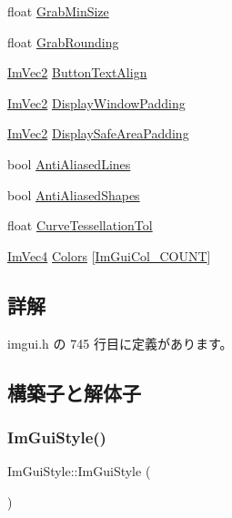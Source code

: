 \begin{DoxyCompactItemize}
\item 
float \mbox{\hyperlink{struct_im_gui_style_a04db033d001b343815cdcd2491576ef7}{Grab\+Min\+Size}}
\item 
float \mbox{\hyperlink{struct_im_gui_style_a42369d83032545066803a7db62936e8f}{Grab\+Rounding}}
\item 
\mbox{\hyperlink{struct_im_vec2}{Im\+Vec2}} \mbox{\hyperlink{struct_im_gui_style_a17246b12f4e069229d21808a87f78514}{Button\+Text\+Align}}
\item 
\mbox{\hyperlink{struct_im_vec2}{Im\+Vec2}} \mbox{\hyperlink{struct_im_gui_style_ab06d6f0c6c5f36ab0c14688448de66f6}{Display\+Window\+Padding}}
\item 
\mbox{\hyperlink{struct_im_vec2}{Im\+Vec2}} \mbox{\hyperlink{struct_im_gui_style_a8dd02a6a031ec8667e76aab1e28755bd}{Display\+Safe\+Area\+Padding}}
\item 
bool \mbox{\hyperlink{struct_im_gui_style_a0164b54454297971d40f3578b2c1ffeb}{Anti\+Aliased\+Lines}}
\item 
bool \mbox{\hyperlink{struct_im_gui_style_ae3c6b2f226fe51631352a637f3defabb}{Anti\+Aliased\+Shapes}}
\item 
float \mbox{\hyperlink{struct_im_gui_style_a41eb9377b63b8b85ab807c28e00198e9}{Curve\+Tessellation\+Tol}}
\item 
\mbox{\hyperlink{struct_im_vec4}{Im\+Vec4}} \mbox{\hyperlink{struct_im_gui_style_a2b4941240a38d1300c39a7fa4f03d0a3}{Colors}} \mbox{[}\mbox{\hyperlink{imgui_8h_a8e46ef7d0c76fbb1916171edfa4ae9e7ac911e17bec14cc3339cf3901a197628b}{Im\+Gui\+Col\+\_\+\+C\+O\+U\+NT}}\mbox{]}
\end{DoxyCompactItemize}


\subsection{詳解}


 imgui.\+h の 745 行目に定義があります。



\subsection{構築子と解体子}
\mbox{\label{struct_im_gui_style_ab0a3ffb3aeec3e6b09b9bde812b28369}} 
\subsubsection{\texorpdfstring{Im\+Gui\+Style()}{ImGuiStyle()}}
{\footnotesize\ttfamily Im\+Gui\+Style\+::\+Im\+Gui\+Style (\begin{DoxyParamCaption}{ }\end{DoxyParamCaption})}



